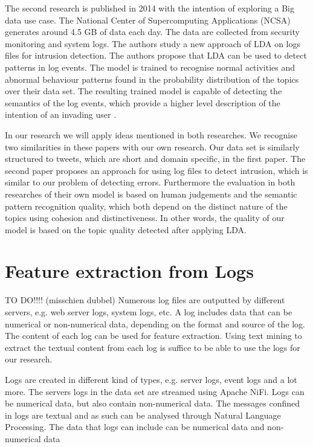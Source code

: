 The second research is published in 2014 with the intention of exploring a Big data use case. The National Center of Supercomputing Applications (NCSA) generates around 4.5 GB of data each day. The data are collected from security monitoring and system logs. The authors study a new approach of LDA on logs files for intrusion detection. The authors propose that LDA can be used to detect patterns in log events. The model is trained to recognise normal activities and abnormal behaviour patterns found in the probability distribution of the topics over their data set. The resulting trained model is capable of detecting the semantics of the log events, which provide a higher level description of the intention of an invading user \cite{Jingwei2014KnowledgeLDA}. 

In our research we will apply ideas mentioned in both researches. We recognise two similarities in these papers with our own research.
Our data set is similarly structured to tweets, which are short and domain specific, in the first paper. The second paper proposes an approach for using log files to detect intrusion, which is similar to our problem of detecting errors. Furthermore the evaluation in both researches of their own model is based on human judgements and the semantic pattern recognition quality, which both depend on the distinct nature of the topics using cohesion and distinctiveness. In other words, the quality of our model is based on the topic quality detected after applying LDA.

\begin{comment}
The domain specific nature of our research is also explored in the second research paper.
\end{comment}

\section{Feature extraction from Logs}\label{theory:featureextraction}
TO DO!!!! (misschien dubbel)
Numerous log files are outputted by different servers, e.g. web server logs, system logs, etc. A log includes data that can be numerical or non-numerical data, depending on the format and source of the log. The content of each log can be used for feature extraction. Using text mining to extract the textual content from each log is suffice to be able to use the logs for our research.

Logs are created in different kind of types, e.g. server logs, event logs and a lot more. The servers logs in the data set are streamed using Apache NiFi. Logs can be numerical data, but also contain non-numerical data. The messages confined in logs are textual and as such can be analysed through Natural Language Processing.
The data that logs can include can be numerical data and non-numerical data

